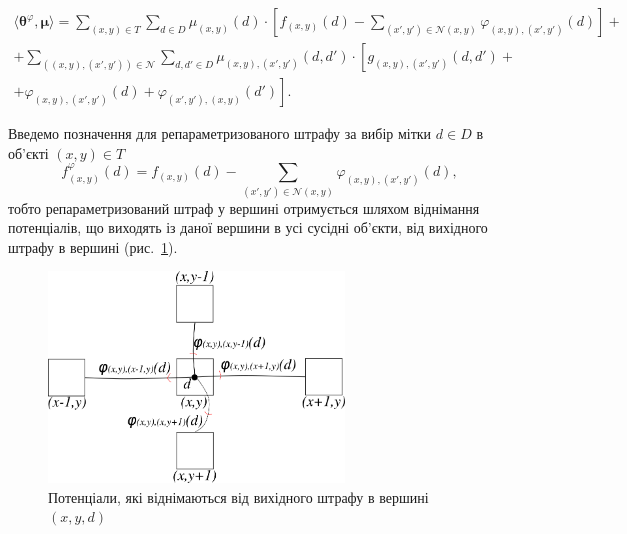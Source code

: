 \begin{equation} \label{grouped:for:reparametrization}
\begin{gathered}
    \langle \pmb{\theta}^{\varphi}, \pmb{\mu} \rangle =
    \sum \limits_{\left(x, y \right) \in T}
        \sum \limits_{d \in D}
            \mu_{\left(x, y \right)} \left(d \right) \cdot \left[
                f_{\left(x, y \right)} \left(d \right) -
                \sum \limits_{\left(x', y' \right) \in \mathcal{N} \left(x, y \right)}
                    \varphi_{\left(x, y \right), \left(x', y' \right)} \left(
                        d
                    \right)
            \right] + \\
    + \sum \limits_{\left(\left(x, y \right), \left(x', y' \right)\right)\in \mathcal{N}}
        \sum \limits_{d, d' \in D}
             \mu_{\left(x, y \right), \left(x', y' \right)} \left(d, d' \right)
             \cdot \left[
                g_{\left(x, y \right), \left(x', y' \right)} \left(d, d' \right) + \right. \\
                + \left. \varphi_{\left(x, y \right), \left(x', y' \right)} \left(
                    d
                \right) +
                \varphi_{\left(x', y' \right), \left(x, y \right)} \left(
                    d'
                \right)
             \right].
\end{gathered}
\end{equation}

Введемо позначення для репараметризованого штрафу за вибір мітки $d \in D$
в об'єкті $\left(x, y \right) \in T$
\begin{equation} \label{reparametrized:vertex}
    f_{\left(x, y \right)}^{\varphi} \left(d \right) =
    f_{\left(x, y \right)} \left(d \right) -
    \sum \limits_{\left(x', y' \right) \in \mathcal{N} \left(x, y \right)}
        \varphi_{\left(x, y \right), \left(x', y' \right)} \left(
            d
        \right),
\end{equation}
тобто репараметризований
штраф у вершині отримується шляхом віднімання потенціалів,
що виходять із даної вершини в усі сусідні об'єкти,
від вихідного штрафу в вершині (рис.~\ref{fig:reparametrized:vertex:weight}).

\begin{figure}[h]
  \centering
  \includegraphics[width=0.7\textwidth]{images/reparametrized_vertex_weight}
  \caption{Потенціали, які віднімаються від вихідного штрафу в вершині $\left(x, y, d \right)$}
  \label{fig:reparametrized:vertex:weight}
\end{figure}

